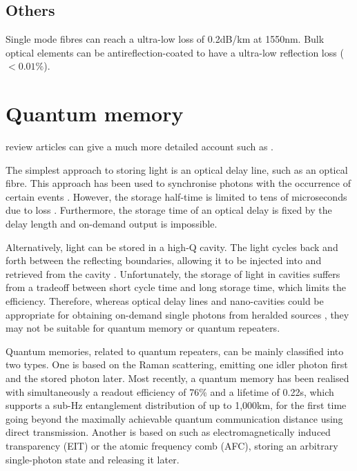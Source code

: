 %
%

\subsection{Others}

Single mode fibres can reach a ultra-low loss of 0.2dB/km at 1550nm. Bulk optical elements can be antireflection-coated to have a ultra-low reflection loss ($<0.01\%$).

%
%

\section{Quantum memory} 

 review articles can give a much more detailed account such as \cite{bib:lvovsky2009optical, bib:simon2010quantum, bib:sangouard2011quantum, bib:bussieres2013prospective, bib:reiserer2015cavity}.

The simplest approach to storing light is an optical delay line, such as an optical fibre. This approach has been used to synchronise photons with the occurrence of certain events \cite{bib:landry2007quantum}. However, the storage half-time is limited to tens of microseconds due to loss \cite{bib:lvovsky2009optical}. Furthermore, the storage time of an optical delay is fixed by the delay length and on-demand output is impossible.

Alternatively, light can be stored in a high-Q cavity. The light cycles back and forth between the reflecting boundaries, allowing it to be injected into and retrieved from the cavity \cite{bib:pittman2002single, bib:pittman2002cyclical, bib:leung2006quantum, bib:maitre1997quantum, bib:tanabe2007trapping, bib:tanabe2009dynamic}. Unfortunately, the storage of light in cavities suffers from a tradeoff between short cycle time and long storage time, which limits the efficiency. Therefore, whereas optical delay lines and nano-cavities could be appropriate for obtaining on-demand single photons from heralded sources \cite{bib:saglamyurek2015quantum, bib:jin2015telecom}, they may not be suitable for quantum memory or quantum repeaters.

Quantum memories, related to quantum repeaters, can be mainly classified into two types. One is based on the Raman scattering, emitting one idler photon first and the stored photon later. Most recently, a quantum memory has been realised with simultaneously a readout efficiency of 76\% and a lifetime of 0.22s, which supports a sub-Hz entanglement distribution of up to 1,000km, for the first time going beyond the maximally achievable quantum communication distance using direct transmission. Another is based on such as electromagnetically induced transparency (EIT) or the atomic frequency comb (AFC), storing an arbitrary single-photon state and releasing it later.

